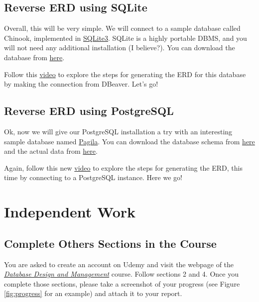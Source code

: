 \documentclass{article}
\begin{document}
\subsection{Reverse ERD using SQLite}
Overall, this will be very simple. We will connect to a sample database called Chinook, implemented in \href{https://www.sqlite.org/}{SQLite3}. SQLite is a highly portable DBMS, and you will not need any additional installation (I believe?). You can download the database from \href{https://drive.google.com/file/d/1BWhCaN7Bp989HNRn55sO7lB7k-9aBwbS/view?usp=sharing}{here}.

Follow this \href{https://drive.google.com/file/d/1d04-Wx6gUBqxyDga-DLC4kZKiKGjq62F/view?usp=sharing}{video} to explore the steps for generating the ERD for this database by making the connection from DBeaver. Let's go!

\subsection{Reverse ERD using PostgreSQL}
Ok, now we will give our PostgreSQL installation a try with an interesting sample database named \href{https://github.com/devrimgunduz/pagila}{Pagila}. You can download the database schema from \href{https://drive.google.com/file/d/1XAHXlBIfAxmSvh8bWeMIy81YppZXu21w/view?usp=sharing}{here} and the actual data from \href{https://drive.google.com/file/d/1l3_LFHdKv9YvfaQ-aZoqeDMOjSkLTmqR/view?usp=sharing}{here}.

Again, follow this new \href{https://drive.google.com/file/d/1394GbIGQkrgSWgQN9jtLSjVkbp7NC226/view?usp=sharing}{video} to explore the steps for generating the ERD, this time by connecting to a PostgreSQL instance. Here we go!

\section{Independent Work}
\subsection{Complete Others Sections in the Course}
You are asked to create an account on Udemy and visit the webpage of the \href{https://www.udemy.com/course/database-design-and-management/}{\textit{Database Design and Management}} course. Follow sections 2 and 4. Once you complete those sections, please take a screenshot of your progress (see Figure \ref{fig:progress} for an example) and attach it to your report.
\end{document}
